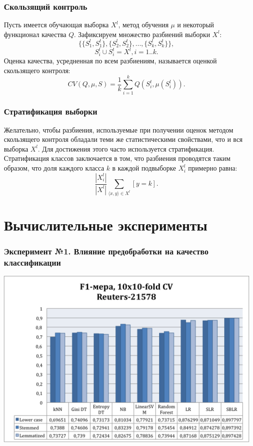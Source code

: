 \documentclass{beamer}
\begin{document}
\begin{frame}
\frametitle{Скользящий контроль}
	Пусть имеется обучающая выборка $X^l$, метод обучения $\mu$ и некоторый функционал качества $Q$. Зафиксируем множество разбиений выборки $X^l$:
	$$\{\{S_1^l,S_1^t\},\{S_2^l,S_2^t\},...,\{S_k^l,S_k^t\}\},$$
	$$S_i^l \cup S_i^t = X^l, i=1..k.$$
	Оценка качества, усредненная по всем разбиениям, называется оценкой скользящего контроля:
	$$CV(Q,\mu,S)=\frac{1}{k}\sum\limits_{i=1}^{k}Q(S_i^t,\mu(S_i^l)).$$
\end{frame}

\begin{frame}
\frametitle{Стратификация выборки}
	Желательно, чтобы разбиения, используемые при получении оценок методом скользящего контроля обладали теми же статистическими свойствами, что и вся выборка $X^l$. Для достижения этого часто используется стратификация.
	\newline
	\newline
	Стратификация классов заключается в том, что разбиения проводятся таким образом, что доля каждого класса $k$ в каждой подвыборке $X_i^l$ примерно равна:
	$$\frac{|X_i^l|}{|X^l|}\sum\limits_{\langle x,y \rangle \in X^l}^{}[y=k].$$
\end{frame}

\section{Вычислительные эксперименты}
\begin{frame}
\end{frame}

\begin{frame}
\frametitle{Эксперимент №1. Влияние предобработки на качество классификации}
\begin{center}
    \includegraphics[width=\linewidth,height=0.7\textheight,align=\center,keepaspectratio, trim=4 4 4 4, clip]{reuters-preprocessing.png}
\end{center}
\end{frame}
\end{document}
